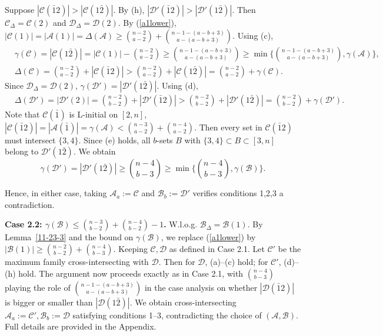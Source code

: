 \documentclass[11pt]{article}
\def\marrow{{\boldmath {\marginpar[\hfill$\rightarrow \rightarrow$]{$\leftarrow \leftarrow$}}}}
\def\andrey#1{{\sc Andrey: }{\marrow\sf \textcolor{blue}{#1}}}
\newcommand{\m}{\mathcal}
\begin{document}
Suppose $|\mathcal{C}(\bar12)|> |\mathcal{C}(1\bar{2})|$. 
By (h), $|\mathcal{D}'(\bar12)|> |\mathcal{D}'(1\bar{2})|$.
Then $\m C_{\Delta}=\m C(2)$ and $\m D_{\Delta}=\m D(2)$. 
By (\ref{a1lower}), $|\m C(1)|=|\m A(1)|=\Delta(\mathcal{A})\ge {n-2\choose a-2}+{n-1-(a-b+3)\choose a-(a-b+3)}$. Using (c), 
\begin{align*}
    &\gamma(\mathcal{C})=|\mathcal{C}(1\bar2)|= |\mathcal{C}(1)|-{n-2\choose a-2}\ge {n-1-(a-b+3)\choose a-(a-b+3)} \ge \min \{{n-1-(a-b+3)\choose a-(a-b+3)}, \gamma(\mathcal{A})\},\\
    &\Delta(\mathcal{C})={n-2\choose a-2}+|\m C(\bar12)|> {n-2\choose a-2}+|\m C(1\bar2)|= {n-2\choose a-2}+\gamma(\mathcal{C}).
\end{align*}
Since $\m D_{\Delta}=\m D(2)$, $\gamma(\mathcal{D}')=|\mathcal{D}'(1\bar{2})|$. Using (d), 
\begin{align*}
    &\Delta(\mathcal{D}')=|\m D'(2)|={n-2\choose b-2}+|\m D'(\bar12)|> {n-2\choose b-2}+|\m D'(1\bar2)|= {n-2\choose b-2}+\gamma(\mathcal{D}').
\end{align*}
Note that $\m C(\bar1)$ is L-initial on $[2,n]$, $|\m C(\bar12)|=|\m A(\bar{1})|=\gamma(\mathcal{A})< {n-3\choose a-2}+{n-4\choose a-2}$. 
Then every set in $\m C(\bar12)$ must intersect $\{3,4\}$.
Since (e) holds, all $b$-sets $B$ with $\{3,4\}\subset B\subset [3, n]$ belong to $\m D'(1\bar2)$. %
We obtain 
$$\gamma(\mathcal{D}')=|\mathcal{D}'(1\bar{2})|\ge {n-4\choose b-3}\ge \min \{{n-4\choose b-3}, \gamma(\mathcal{B})\}.$$ 

Hence, in either case, taking $\m A_a:=\m C$ and $\m B_b:=\m D'$ verifies conditions 1,2,3 a contradiction. 

\textbf{Case 2.2: $\gamma(\mathcal{B})\le\binom{n-3}{b-2}+\binom{n-4}{b-2}-1$.}
W.l.o.g. $\mathcal{B}_\Delta=\mathcal{B}(1)$. By Lemma~\ref{11-23-3} and the bound 
on $\gamma(\mathcal{B})$, we replace (\ref{a1lower}) by
$|\m B(1)|\ge\binom{n-2}{b-2}+\binom{n-4}{b-3}.$
Keeping $\mathcal{C}, \m D$ as defined in Case 2.1.  
Let $\mathcal{C}'$ be the maximum family cross-intersecting with $\mathcal{D}$. 
Then for $\m D$, (a)--(c) hold; for $\m C'$, (d)--(h) hold. 
The argument now proceeds exactly as in Case 2.1, with $\binom{n-4}{b-3}$ 
playing the role of $\binom{n-1-(a-b+3)}{a-(a-b+3)}$ in the case analysis on whether
$|\m D(\bar12)|$ is bigger or smaller than $|\mathcal{D}(1\bar{2})|$. We obtain 
cross-intersecting $\mathcal{A}_a:=\mathcal{C}',\mathcal{B}_b:=\mathcal{D}$ 
satisfying conditions 1--3, contradicting the choice of $(\mathcal{A},\mathcal{B})$.
Full details are provided in the
Appendix.
\end{document}
